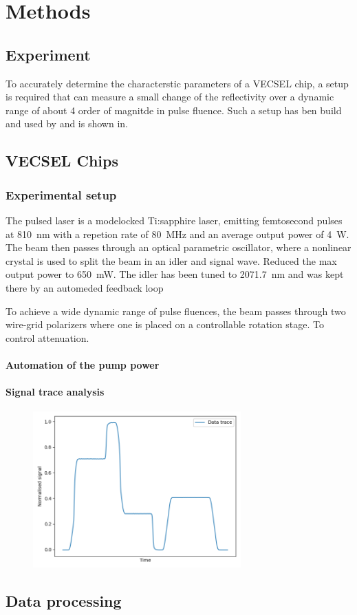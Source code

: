 \chapter{Methods}\label{chapter:methods}
\section{Experiment}\label{sec:experiment}
To accurately determine the characterstic parameters of a VECSEL chip, a setup is required that can measure a small change of the reflectivity over a dynamic range of about 4 order of magnitde in pulse fluence. Such a setup has ben build and used by and is shown in.


\section{VECSEL Chips}

\subsection{Experimental setup}\label{subsection:set-up}
The pulsed laser is a modelocked Ti:sapphire laser, emitting femtosecond pulses at \SI{810}{\nm} with a repetion rate of \SI{80}{\MHz} and an average output power of \SI{4}{\W}. The beam then passes through an optical parametric oscillator, where a nonlinear crystal is used to split the beam in an idler and signal wave. Reduced the max output power to \SI{650}{\mW}. The idler has been tuned to \SI{2071.7}{\nm} and was kept there by an automeded feedback loop 

To achieve a wide dynamic range of pulse fluences, the beam passes through two wire-grid polarizers where one is placed on a controllable rotation stage. To control attenuation.   

\subsubsection{Automation of the pump power}{\label{subsubsection:pump}}
\subsubsection{Signal trace analysis}{\label{subsubsection:signal}}
\begin{figure}[h]
    \centering
    \includegraphics[width=8cm]{images/trace1.png}
\end{figure}
\section{Data processing}\label{sec:processing}


